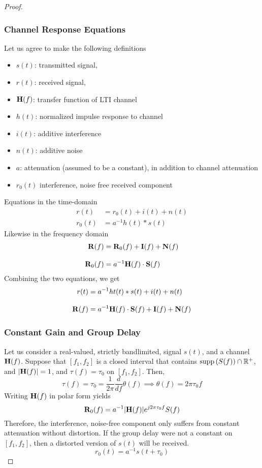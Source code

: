 \documentclass[../../main.tex]{subfiles}
\begin{document}
\begin{proof}
\subsubsection*{Channel Response Equations}
Let us agree to make the following definitions
\begin{itemize}
    \item $s(t)$: transmitted signal,
    \item $r(t)$: received signal,
    \item $\mathbf{H}(f)$: transfer function of LTI channel
    \item $h(t)$: normalized impulse response to channel
    \item $i(t)$: additive interference
    \item $n(t)$: additive noise
    \item $a$: attenuation (assumed to be a constant), in addition to channel attenuation
    \item $r_0(t)$ interference, noise free received component
\end{itemize}
Equations in the time-domain
\begin{align}
    r(t) &= r_0(t) + i(t) + n(t)\\[2ex]
    r_0(t) &= a^{-1}h(t)\ast s(t)
\end{align}
Likewise in the frequency domain
\begin{align}
    \mathbf{R}(f) &= \mathbf{R}_0(f) + \mathbf{I}(f) + \mathbf{N}(f)\\[2ex]
    \mathbf{R}_0(f) &= a^{-1}\mathbf{H}(f)\cdot \mathbf{S}(f)
\end{align}
Combining the two equations, we get
\begin{align}
    r(t) &= a^{-1}ht(t)\ast s(t) + i(t) + n(t)\\[2ex]
    \mathbf{R}(f) &=a^{-1}\mathbf{H}(f)\cdot \mathbf{S}(f) + \mathbf{I}(f) + \mathbf{N}(f)
\end{align}
\subsubsection*{Constant Gain and Group Delay}
Let us consider a real-valued, strictly bandlimited, signal $s(t)$, and a channel $\mathbf{H}(f)$. Suppose that $[f_1,f_2]$ is a closed interval that contains $\operatorname{supp}{(S(f))}\cap \mathbb{R}^+$, and $|\mathbf{H}(f)|=1$, and $\tau(f)=\tau_0$ on $[f_1,f_2]$. Then,
\[
\tau(f) = \tau_0 = \dfrac{1}{2\pi}\frac{d}{df}\theta(f)\implies \theta(f) = 2\pi\tau_0f
\]
Writing $\mathbf{H}(f)$ in polar form yields
\[
\mathbf{R}_0(f) = a^{-1}|\mathbf{H}(f)|e^{j2\pi\tau_0 f}S(f)
\]
Therefore, the interference, noise-free component only suffers from constant attenuation without distortion. If the group delay were not a constant on $[f_1,f_2]$, then a distorted version of $s(t)$ will be received.
\[
r_0(t) = a^{-1}s(t+\tau_0)
\]

\end{proof}
\end{document}
